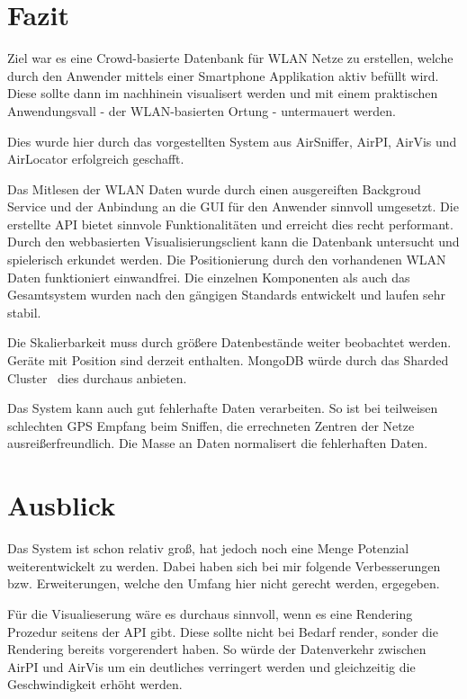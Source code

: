 \documentclass[11pt,a4paper]{article}
\begin{document}
\section{Fazit}

Ziel war es eine Crowd-basierte Datenbank für WLAN Netze zu erstellen, welche durch den Anwender mittels einer Smartphone Applikation aktiv befüllt wird. Diese sollte dann im nachhinein visualisert werden und mit einem praktischen Anwendungsvall - der WLAN-basierten Ortung - untermauert werden.

Dies wurde hier durch das vorgestellten System aus AirSniffer, AirPI, AirVis und AirLocator erfolgreich geschafft. 

Das Mitlesen der WLAN Daten wurde durch einen ausgereiften Backgroud Service und der Anbindung an die GUI für den Anwender sinnvoll umgesetzt. Die erstellte API bietet sinnvole Funktionalitäten und erreicht dies recht performant. Durch den webbasierten Visualisierungsclient kann die Datenbank untersucht und spielerisch erkundet werden. Die Positionierung durch den vorhandenen WLAN Daten funktioniert einwandfrei. Die einzelnen Komponenten als auch das Gesamtsystem wurden nach den gängigen Standards entwickelt und laufen sehr stabil.

Die Skalierbarkeit muss durch größere Datenbestände weiter beobachtet werden.
Geräte mit 
Position sind derzeit enthalten. MongoDB würde durch das Sharded Cluster~\cite{sharding} dies durchaus anbieten.

Das System kann auch gut fehlerhafte Daten verarbeiten. So ist bei teilweisen schlechten GPS Empfang beim Sniffen, die errechneten Zentren der Netze ausreißerfreundlich. Die Masse an Daten normalisert die fehlerhaften Daten.

\section{Ausblick}

Das System ist schon relativ groß, hat jedoch noch eine Menge Potenzial weiterentwickelt zu werden. Dabei haben sich bei mir folgende Verbesserungen bzw. Erweiterungen, welche den Umfang hier nicht gerecht werden, ergegeben.

Für die Visualieserung wäre es durchaus sinnvoll, wenn es eine Rendering Prozedur seitens der API gibt. Diese sollte nicht bei Bedarf render, sonder die Rendering bereits vorgerendert haben. So würde der Datenverkehr zwischen AirPI und AirVis um ein deutliches verringert werden und gleichzeitig die Geschwindigkeit erhöht werden.
\end{document}
